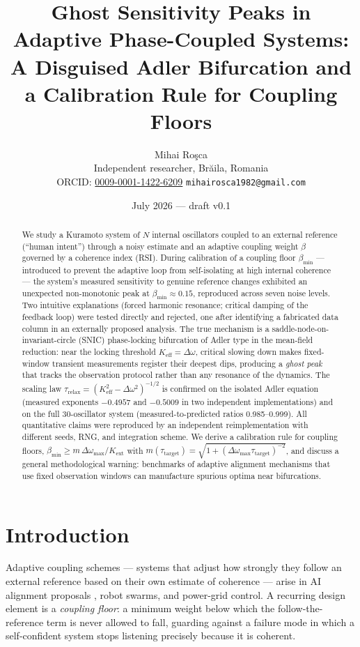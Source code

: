 \documentclass[11pt]{article}
\title{Ghost Sensitivity Peaks in Adaptive Phase-Coupled Systems:\\
A Disguised Adler Bifurcation and a Calibration Rule for Coupling Floors}
\author{Mihai Ro\c{s}ca\\
\small Independent researcher, Br\u{a}ila, Romania\\
\small ORCID: \href{https://orcid.org/0009-0001-1422-6209}{0009-0001-1422-6209} \quad
\small \texttt{mihairosca1982@gmail.com}}
\date{July 2026 --- draft v0.1}
\newcommand{\Keff}{K_{\mathrm{eff}}}
\newcommand{\bmin}{\beta_{\min}}
\newcommand{\dw}{\Delta\omega}
\newcommand{\taurelax}{\tau_{\mathrm{relax}}}
\begin{document}
\maketitle

\begin{abstract}
We study a Kuramoto system of $N$ internal oscillators coupled to an external
reference (``human intent'') through a noisy estimate and an adaptive coupling
weight $\beta$ governed by a coherence index (RSI). During calibration of a
coupling floor $\bmin$ --- introduced to prevent the adaptive loop from
self-isolating at high internal coherence --- the system's measured sensitivity
to genuine reference changes exhibited an unexpected non-monotonic peak at
$\bmin \approx 0.15$, reproduced across seven noise levels. Two intuitive
explanations (forced harmonic resonance; critical damping of the feedback loop)
were tested directly and rejected, one after identifying a fabricated data
column in an externally proposed analysis. The true mechanism is a
saddle-node-on-invariant-circle (SNIC) phase-locking bifurcation of Adler type
in the mean-field reduction: near the locking threshold $\Keff = \dw$, critical
slowing down makes fixed-window transient measurements register their deepest
dips, producing a \emph{ghost peak} that tracks the observation protocol rather
than any resonance of the dynamics. The scaling law
$\taurelax = (\Keff^2 - \dw^2)^{-1/2}$ is confirmed on the isolated Adler
equation (measured exponents $-0.4957$ and $-0.5009$ in two independent
implementations) and on the full 30-oscillator system (measured-to-predicted
ratios 0.985--0.999). All quantitative claims were reproduced by an independent
reimplementation with different seeds, RNG, and integration scheme. We derive a
calibration rule for coupling floors, $\bmin \ge m\,\dw_{\max}/K_{\mathrm{ext}}$
with $m(\tau_{\mathrm{target}}) = \sqrt{1 + (\dw_{\max}\tau_{\mathrm{target}})^{-2}}$,
and discuss a general methodological warning: benchmarks of adaptive alignment
mechanisms that use fixed observation windows can manufacture spurious optima
near bifurcations.
\end{abstract}

\section{Introduction}

Adaptive coupling schemes --- systems that adjust how strongly they follow an
external reference based on their own estimate of coherence --- arise in AI
alignment proposals \cite{miyato2025}, robot swarms, and power-grid control. A
recurring design element is a \emph{coupling floor}: a minimum weight below
which the follow-the-reference term is never allowed to fall, guarding against
a failure mode in which a self-confident system stops listening precisely
because it is coherent.
\end{document}
